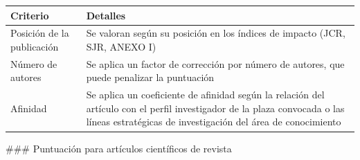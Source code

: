 \documentclass{article}
\begin{document}
\begin{itemize}
\begin{itemize}
                \vspace{0.4cm}
                \begin{table}[h!]\centering\renewcommand{\arraystretch}{1.3}
                  \begin{tabular}{|p{}|p{}|}\hline
                    Criterio                   & Detalles                                                                                                                                                                                 \\\hline
                    Posición de la publicación & Se valoran según su posición en los índices de impacto (JCR, SJR, ANEXO I)                                                                                                               \\\hline
                    Número de autores          & Se aplica un factor de corrección por número de autores, que puede penalizar la puntuación                                                                                               \\\hline
                    Afinidad                   & Se aplica un coeficiente de afinidad según la relación del artículo con el perfil investigador de la plaza convocada o las líneas estratégicas de investigación del área de conocimiento \\\hline
                  \end{tabular}\end{table}
                \vspace{0.4cm}

                \#\#\# Puntuación para artículos científicos de revista


\end{itemize}
\end{itemize}
\end{document}
